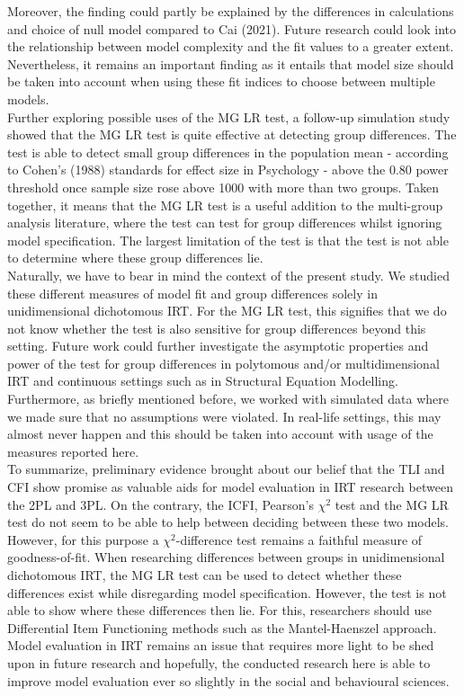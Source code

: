 \documentclass[Royal,sageapa,times,doublespace]{sagej}
\begin{document}

Moreover, the finding could partly be explained by the differences in calculations and choice of null model compared to Cai (2021). Future research could look into the relationship between model complexity and the fit values to a greater extent. Nevertheless, it remains an important finding as it entails that model size should be taken into account when using these fit indices to choose between multiple models. \\
\indent Further exploring possible uses of the MG LR test, a follow-up simulation study showed that the MG LR test is quite effective at detecting group differences. The test is able to detect small group differences in the population mean - according to Cohen's (1988) standards for effect size in Psychology - above the 0.80 power threshold once sample size rose above 1000 with more than two groups. Taken together, it means that the MG LR test is a useful addition to the multi-group analysis literature, where the test can test for group differences whilst ignoring model specification. The largest limitation of the test is that the test is not able to determine where these group differences lie. \\


\indent Naturally, we have to bear in mind the context of the present study. We studied these different measures of model fit and group differences solely in unidimensional dichotomous IRT. For the MG LR test, this signifies that we do not know whether the test is also sensitive for group differences beyond this setting. Future work could further investigate the asymptotic properties and power of the test for group differences in polytomous and/or multidimensional IRT and continuous settings such as in Structural Equation Modelling. Furthermore, as briefly mentioned before, we worked with simulated data where we made sure that no assumptions were violated. In real-life settings, this may almost never happen and this should be taken into account with usage of the measures reported here. \\

\indent To summarize, preliminary evidence brought about our belief that the TLI and CFI show promise as valuable aids for model evaluation in IRT research between the 2PL and 3PL. On the contrary, the ICFI, Pearson's $\chi^2$ test and the MG LR test do not seem to be able to help between deciding between these two models. However, for this purpose a $\chi^2$-difference test remains a faithful measure of goodness-of-fit. When researching differences between groups in unidimensional dichotomous IRT, the MG LR test can be used to detect whether these differences exist while disregarding model specification. However, the test is not able to show where these differences then lie. For this, researchers should use Differential Item Functioning methods such as the Mantel-Haenszel approach. Model evaluation in IRT remains an issue that requires more light to be shed upon in future research and hopefully, the conducted research here is able to improve model evaluation ever so slightly in the social and behavioural sciences. 

\newpage

%
%
\end{document}
